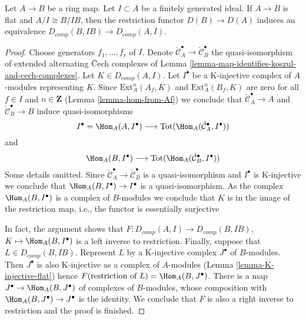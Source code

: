 \begin{lemma}
\label{lemma-restriction-derived-complete-equivalence}
Let $A \to B$ be a ring map. Let $I \subset A$ be a finitely generated ideal.
If $A \to B$ is flat and $A/I \cong B/IB$, then the restriction functor
$D(B) \to D(A)$ induces an equivalence
$D_{comp}(B, IB) \to D_{comp}(A, I)$.
\end{lemma}

\begin{proof}
Choose generators $f_1, \ldots, f_r$ of $I$.
Denote $\check{\mathcal{C}}^\bullet_A \to \check{\mathcal{C}}^\bullet_B$
the quasi-isomorphism of extended alternating {\v C}ech complexes of
Lemma \ref{lemma-map-identifies-koszul-and-cech-complexes}.
Let $K \in D_{comp}(A, I)$. Let $I^\bullet$ be a K-injective
complex of $A$-modules representing $K$. Since $\text{Ext}^n_A(A_f, K)$
and $\text{Ext}^n_A(B_f, K)$ are zero for all $f \in I$ and
$n \in \mathbf{Z}$ (Lemma \ref{lemma-hom-from-Af}) we conclude that
$\check{\mathcal{C}}^\bullet_A \to A$ and
$\check{\mathcal{C}}^\bullet_B \to B$ induce quasi-isomorphisms
$$
I^\bullet = \Hom_A(A, I^\bullet) \longrightarrow
\text{Tot}(\Hom_A(\check{\mathcal{C}}^\bullet_A, I^\bullet))
$$
and
$$
\Hom_A(B, I^\bullet) \longrightarrow
\text{Tot}(\Hom_A(\check{\mathcal{C}}^\bullet_B, I^\bullet))
$$
Some details omitted.
Since $\check{\mathcal{C}}^\bullet_A \to \check{\mathcal{C}}^\bullet_B$
is a quasi-isomorphism and $I^\bullet$ is K-injective we conclude
that $\Hom_A(B, I^\bullet) \to I^\bullet$ is a quasi-isomorphism.
As the complex $\Hom_A(B, I^\bullet)$ is a complex of $B$-modules
we conclude that $K$ is in the image of the restriction map, i.e.,
the functor is essentially surjective

\medskip\noindent
In fact, the argument shows that
$F : D_{comp}(A, I) \to D_{comp}(B, IB)$, $K \mapsto \Hom_A(B, I^\bullet)$
is a left inverse to restriction. Finally, suppose that
$L \in D_{comp}(B, IB)$. Represent $L$ by a K-injective complex
$J^\bullet$ of $B$-modules.
Then $J^\bullet$ is also K-injective as a complex of $A$-modules
(Lemma \ref{lemma-K-injective-flat}) hence
$F(\text{restriction of }L) = \Hom_A(B, J^\bullet)$.
There is a map $J^\bullet \to \Hom_A(B, J^\bullet)$
of complexes of $B$-modules, whose composition with
$\Hom_A(B, J^\bullet) \to J^\bullet$ is the identity.
We conclude that $F$ is also a right inverse to restriction
and the proof is finished.
\end{proof}





